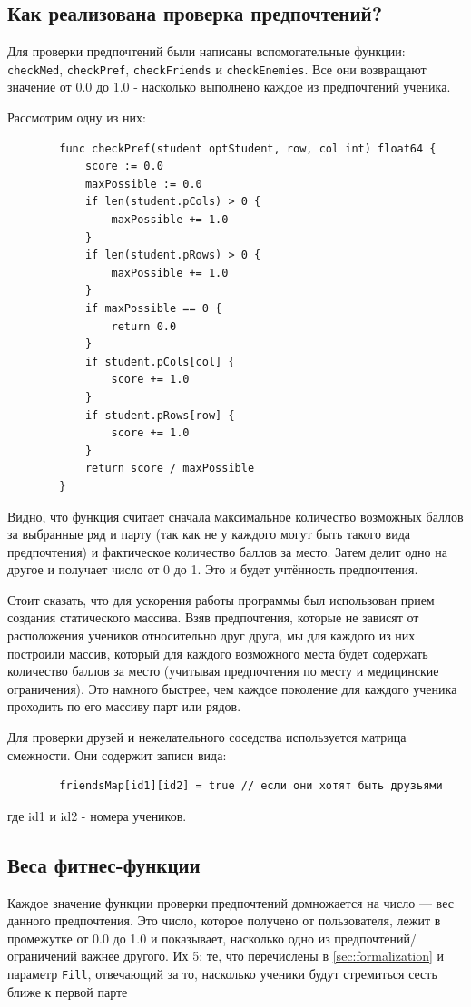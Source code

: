 \documentclass[12pt,a4paper]{extarticle} %
\begin{document}
	\subsection{Как реализована проверка предпочтений?}
	Для проверки предпочтений были написаны вспомогательные функции: \texttt{checkMed}, \texttt{checkPref}, \texttt{checkFriends} и \texttt{checkEnemies}. Все они возвращают значение от 0.0 до 1.0 - насколько выполнено каждое из предпочтений ученика.
	
	Рассмотрим одну из них:
	
	\begin{verbatim}
		func checkPref(student optStudent, row, col int) float64 {
			score := 0.0
			maxPossible := 0.0
			if len(student.pCols) > 0 {
				maxPossible += 1.0
			}
			if len(student.pRows) > 0 {
				maxPossible += 1.0
			}
			if maxPossible == 0 {
				return 0.0
			}
			if student.pCols[col] {
				score += 1.0
			}
			if student.pRows[row] {
				score += 1.0
			}
			return score / maxPossible
		}
	\end{verbatim}
	
	Видно, что функция считает сначала максимальное количество возможных баллов за выбранные ряд и парту (так как не у каждого могут быть такого вида предпочтения) и фактическое количество баллов за место. Затем делит одно на другое и получает число от 0 до 1. Это и будет учтённость предпочтения.
	
	Стоит сказать, что для ускорения работы программы был использован прием создания статического массива. Взяв предпочтения, которые не зависят от расположения учеников относительно друг друга, мы для каждого из них построили массив, который для каждого возможного места будет содержать количество баллов за место (учитывая предпочтения по месту и медицинские ограничения). Это намного быстрее, чем каждое поколение для каждого ученика проходить по его массиву парт или рядов.
	
	Для проверки друзей и нежелательного соседства используется матрица смежности. Они содержит записи вида:
	
	\begin{verbatim}
		friendsMap[id1][id2] = true // если они хотят быть друзьями
	\end{verbatim}
	
	где id1 и id2 - номера учеников.
	
	\subsection{Веса фитнес-функции}
	Каждое значение функции проверки предпочтений домножается на число --- вес данного предпочтения. Это число, которое получено от пользователя, лежит в промежутке от 0.0 до 1.0 и показывает, насколько одно из предпочтений/ограничений важнее другого. Их 5: те, что перечислены в \cref{sec:formalization} и параметр \texttt{Fill}, отвечающий за то, насколько ученики будут стремиться сесть ближе к первой парте
	
\end{document}

